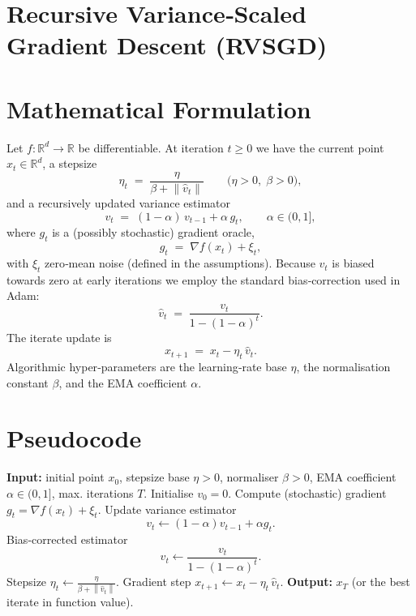 \documentclass{article}
\newcommand{\norm}[1]{\left\lVert#1\right\rVert}
\begin{document}
\section*{Recursive Variance‑Scaled Gradient Descent (RVSGD)}

\section*{Mathematical Formulation}
Let $f:\mathbb{R}^{d}\rightarrow\mathbb{R}$ be differentiable.  
At iteration $t\ge 0$ we have the current point $x_t\in\mathbb{R}^{d}$, a stepsize
\[
\eta_t\;=\;\frac{\eta}{\beta+\norm{\hat v_t}}\qquad 
\bigl(\eta>0,\;\beta>0\bigr),
\]
and a recursively updated variance estimator
\begin{equation}
\label{eq:rec}
v_t \;=\;(1-\alpha)\,v_{t-1}+\alpha\,g_t,\qquad 
\alpha\in(0,1],
\end{equation}
where $g_t$ is a (possibly stochastic) gradient oracle,
\[
g_t\;=\;\nabla f(x_t)+\xi_t,
\]
with $\xi_t$ zero‑mean noise (defined in the assumptions).  
Because $v_t$ is biased towards zero at early iterations we employ the standard
bias‑correction used in Adam:
\begin{equation}
\label{eq:bias}
\hat v_t \;=\;\frac{v_t}{1-(1-\alpha)^t}.
\end{equation}
The iterate update is
\begin{equation}
\label{eq:update}
x_{t+1}\;=\;x_t-\eta_t\,\hat v_t .
\end{equation}
Algorithmic hyper‑parameters are the learning‑rate base $\eta$, the
normalisation constant $\beta$, and the EMA coefficient $\alpha$.

\section*{Pseudocode}
\begin{algorithm}[H]
\caption{Recursive Variance‑Scaled Gradient Descent (RVSGD)}
\label{alg:rvsgd}
\begin{algorithmic}[1]
\STATE \textbf{Input:} initial point $x_0$, stepsize base $\eta>0$, 
normaliser $\beta>0$, EMA coefficient $\alpha\in(0,1]$, 
max. iterations $T$.
\STATE Initialise $v_{0}=0$.
    \STATE Compute (stochastic) gradient $g_t=\nabla f(x_t)+\xi_t$.
    \STATE Update variance estimator 
    \[
    v_t\gets (1-\alpha)v_{t-1}+\alpha g_t .
    \]
    \STATE Bias‑corrected estimator 
    \[
    \hat v_t\gets \frac{v_t}{1-(1-\alpha)^t}.
    \]
    \STATE Stepsize $\displaystyle \eta_t\gets \frac{\eta}{\beta+\norm{\hat v_t}}$.
    \STATE Gradient step $x_{t+1}\gets x_t-\eta_t\,\hat v_t$.
\ENDFOR
\STATE \textbf{Output:} $x_T$ (or the best iterate in function value).
\end{algorithmic}
\end{algorithm}
\end{document}
